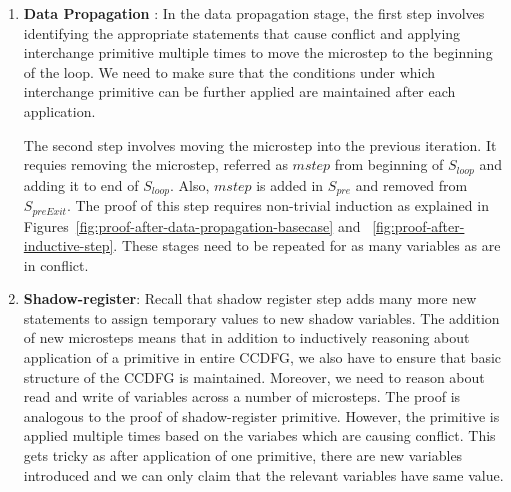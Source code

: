 \begin{enumerate}
\item {\textbf {Data Propagation}} : In the data propagation stage, the first step involves identifying 
the appropriate statements that cause conflict and applying interchange primitive multiple times 
to move the microstep to the beginning of the loop. We need to make sure that the conditions under which
interchange primitive can be further applied are maintained after each application.
 
The second step involves moving the microstep into the previous iteration. 
It requies removing the microstep, referred as $mstep$ from beginning of $S_{loop}$ and adding it to end of $S_{loop}$. 
Also, $mstep$ is added in $S_{pre}$ and removed 
from $S_{preExit}$. The proof of this step requires non-trivial induction as explained in Figures~\ref{fig:proof-after-data-propagation-basecase} and ~\ref{fig:proof-after-inductive-step}. 
These stages need to be
repeated for as many variables as are in conflict. 

\item \textbf{Shadow-register}: Recall that shadow register step adds many more new statements to assign temporary values to 
new shadow variables. The addition of new microsteps means that in addition to inductively reasoning about application of a primitive in entire CCDFG, we also have to ensure that basic structure of the CCDFG is maintained. Moreover, we need to reason about read and write of 
variables across a number of microsteps. The proof is analogous to the proof of shadow-register primitive. However, the primitive is applied multiple times based on the variabes which are causing conflict. This gets tricky as after application of one primitive, there are new variables introduced and we can only claim that the relevant variables have same value.


\end{enumerate}
